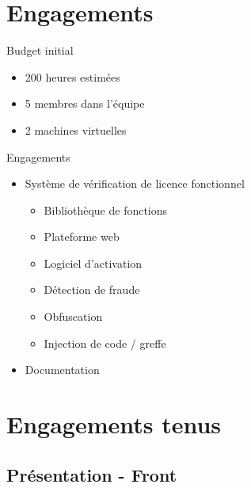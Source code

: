 \documentclass{cubeamer}
\begin{document}
\section{Engagements}

\begin{frame}{Budget initial}
    \begin{itemize}
        \item 200 heures estimées
        \item 5 membres dans l'équipe
        \item 2 machines virtuelles
      \end{itemize}
\end{frame}

\begin{frame}{Engagements}
    \begin{itemize}
        \item Système de vérification de licence fonctionnel
        \begin{itemize}
        \item Bibliothèque de fonctions
        \item Plateforme web
        \item Logiciel d'activation
        \item Détection de fraude
        \item Obfuscation
        \item Injection de code / greffe 
        \end{itemize}
        \item Documentation
    \end{itemize}
\end{frame}

\section{Engagements tenus}

\subsection{Présentation - Front}
\end{document}
